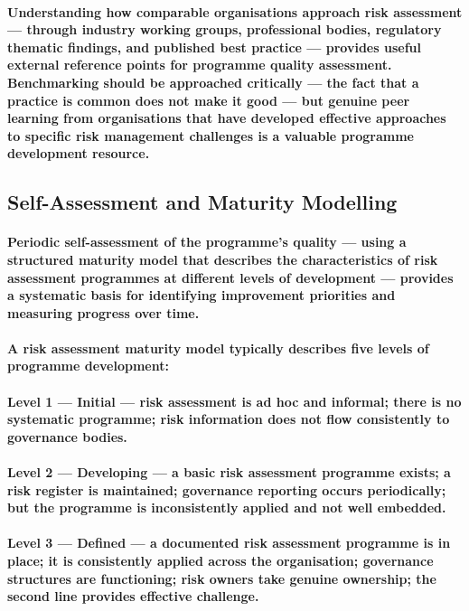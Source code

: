 \paragraph{Understanding how comparable organisations approach risk assessment — through industry working groups, professional bodies, regulatory thematic findings, and published best practice — provides useful external reference points for programme quality assessment. Benchmarking should be approached critically — the fact that a practice is common does not make it good — but genuine peer learning from organisations that have developed effective approaches to specific risk management challenges is a valuable programme development resource.}

\subsection{Self-Assessment and Maturity Modelling}
\paragraph{Periodic self-assessment of the programme's quality — using a structured maturity model that describes the characteristics of risk assessment programmes at different levels of development — provides a systematic basis for identifying improvement priorities and measuring progress over time.}
\paragraph{A risk assessment maturity model typically describes five levels of programme development:}
\paragraph{\textbf{Level 1 — Initial} — risk assessment is ad hoc and informal; there is no systematic programme; risk information does not flow consistently to governance bodies.}
\paragraph{\textbf{Level 2 — Developing} — a basic risk assessment programme exists; a risk register is maintained; governance reporting occurs periodically; but the programme is inconsistently applied and not well embedded.}
\paragraph{\textbf{Level 3 — Defined} — a documented risk assessment programme is in place; it is consistently applied across the organisation; governance structures are functioning; risk owners take genuine ownership; the second line provides effective challenge.}

